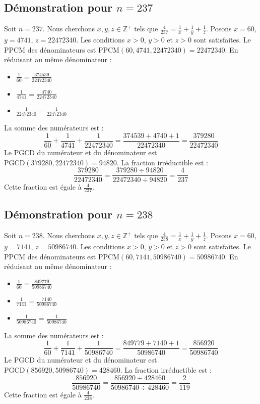 \documentclass[11pt,a4paper]{article}
\begin{document}
\subsection{Démonstration pour $n = 237$}
Soit $n = 237$. Nous cherchons $x, y, z \in \mathbb{Z}^{+}$ tels que $\frac{4}{237} = \frac{1}{x} + \frac{1}{y} + \frac{1}{z}$.
Posons $x = 60$, $y = 4741$, $z = 22472340$.
Les conditions $x > 0$, $y > 0$ et $z > 0$ sont satisfaites.
Le PPCM des dénominateurs est $\text{PPCM}(60, 4741, 22472340) = 22472340$.
En réduisant au même dénominateur :
\begin{itemize}
    \item $\frac{1}{60} = \frac{374539}{22472340}$
    \item $\frac{1}{4741} = \frac{4740}{22472340}$
    \item $\frac{1}{22472340} = \frac{1}{22472340}$
\end{itemize}
La somme des numérateurs est :
$$ \frac{1}{60} + \frac{1}{4741} + \frac{1}{22472340} = \frac{374539 + 4740 + 1}{22472340} = \frac{379280}{22472340} $$
Le PGCD du numérateur et du dénominateur est $\text{PGCD}(379280, 22472340) = 94820$.
La fraction irréductible est :
$$ \frac{379280}{22472340} = \frac{379280 \div 94820}{22472340 \div 94820} = \frac{4}{237} $$
Cette fraction est égale à $\frac{4}{237}$.

\subsection{Démonstration pour $n = 238$}
Soit $n = 238$. Nous cherchons $x, y, z \in \mathbb{Z}^{+}$ tels que $\frac{4}{238} = \frac{1}{x} + \frac{1}{y} + \frac{1}{z}$.
Posons $x = 60$, $y = 7141$, $z = 50986740$.
Les conditions $x > 0$, $y > 0$ et $z > 0$ sont satisfaites.
Le PPCM des dénominateurs est $\text{PPCM}(60, 7141, 50986740) = 50986740$.
En réduisant au même dénominateur :
\begin{itemize}
    \item $\frac{1}{60} = \frac{849779}{50986740}$
    \item $\frac{1}{7141} = \frac{7140}{50986740}$
    \item $\frac{1}{50986740} = \frac{1}{50986740}$
\end{itemize}
La somme des numérateurs est :
$$ \frac{1}{60} + \frac{1}{7141} + \frac{1}{50986740} = \frac{849779 + 7140 + 1}{50986740} = \frac{856920}{50986740} $$
Le PGCD du numérateur et du dénominateur est $\text{PGCD}(856920, 50986740) = 428460$.
La fraction irréductible est :
$$ \frac{856920}{50986740} = \frac{856920 \div 428460}{50986740 \div 428460} = \frac{2}{119} $$
Cette fraction est égale à $\frac{4}{238}$.
\end{document}

